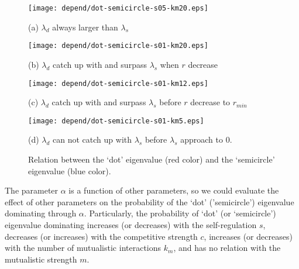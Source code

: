 \documentclass[a4paper,fleqn,12pt]{article}
\begin{document}
\begin{figure}[htbp]
\begin{minipage}{0.4\linewidth}
  \texttt{[image: depend/dot-semicircle-s05-km20.eps]}
  {\centering(a) $\lambda_d$ always larger than $\lambda_s$\par}
\end{minipage}
\hfill
\begin{minipage}{0.4\linewidth}
  \texttt{[image: depend/dot-semicircle-s01-km20.eps]}
  {\centering(b) $\lambda_d$ catch up with and surpass $\lambda_s$ when $r$ decrease\par}
\end{minipage}
\vfill
\begin{minipage}{0.4\linewidth}
  \texttt{[image: depend/dot-semicircle-s01-km12.eps]}
  {\centering(c) $\lambda_d$ catch up with and surpass $\lambda_s$ before $r$ decrease to $r_{min}$\par}
\end{minipage}
\hfill
\begin{minipage}{0.4\linewidth}
  \texttt{[image: depend/dot-semicircle-s01-km5.eps]}
  {\centering(d) $\lambda_d$ can not catch up with $\lambda_s$ before $\lambda_s$ approach to $0$.\par}
\end{minipage}
\caption{Relation between the `dot' eigenvalue (red color) and the `semicircle' eigenvalue (blue color).}
\label{fig:dot-semicircle-examples-2}
\end{figure}

The parameter $\alpha$ is a function of other parameters,
so we could evaluate the effect of other parameters on the probability of the ‘dot’ (’semicircle’) eigenvalue dominating through $\alpha$.
Particularly, the probability of ‘dot’ (or ‘semicircle’) eigenvalue dominating increases (or decreases) with the self-regulation $s$,
decreases (or increases) with the competitive strength $c$,
increases (or decreases) with the number of mutualistic interactions $k_m$,
and has no relation with the mutualistic strength $m$.
\end{document}
